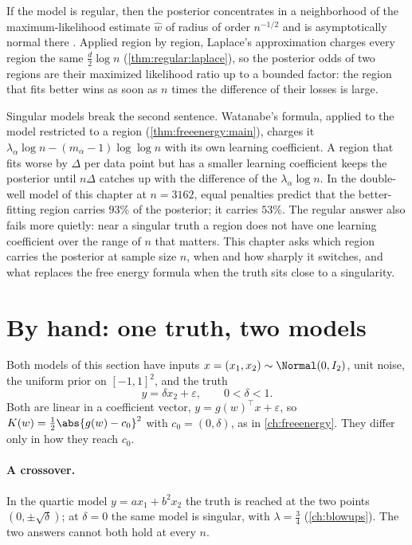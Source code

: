 \begin{refsection}
\begin{regularanswer}
If the model is regular, then the posterior concentrates in a neighborhood of the maximum-likelihood estimate $\hat w$ of radius of order $n^{-1/2}$ and is asymptotically normal there \parencite[Theorem~10.1]{vanderVaart1998}. Applied region by region, Laplace's approximation charges every region the same $\frac d2\log n$ (\cref{thm:regular:laplace}), so the posterior odds of two regions are their maximized likelihood ratio up to a bounded factor: the region that fits better wins as soon as $n$ times the difference of their losses is large.
\end{regularanswer}

Singular models break the second sentence. Watanabe's formula, applied to the model restricted to a region (\cref{thm:freeenergy:main}), charges it $\lambda_\alpha\log n-(m_\alpha-1)\log\log n$ with its own learning coefficient. A region that fits worse by $\Delta$ per data point but has a smaller learning coefficient keeps the posterior until $n\Delta$ catches up with the difference of the $\lambda_\alpha\log n$. In the double-well model of this chapter at $n=3162$, equal penalties predict that the better-fitting region carries $93\%$ of the posterior; it carries $53\%$. The regular answer also fails more quietly: near a singular truth a region does not have one learning coefficient over the range of $n$ that matters. This chapter asks which region carries the posterior at sample size $n$, when and how sharply it switches, and what replaces the free energy formula when the truth sits close to a singularity.

\section{By hand: one truth, two models}\label{sec:phases:byhand}

Both models of this section have inputs $x=(x_1,x_2)\sim\Normal(0,I_2)$, unit noise, the uniform prior on $[-1,1]^2$, and the truth
\[
y=\delta x_2+\varepsilon,\qquad 0<\delta<1 .
\]
Both are linear in a coefficient vector, $y=g(w)^\top x+\varepsilon$, so $K(w)=\frac12\abs{g(w)-c_0}^2$ with $c_0=(0,\delta)$, as in \cref{ch:freeenergy}. They differ only in how they reach $c_0$.

\paragraph{A crossover.} In the quartic model $y=ax_1+b^2x_2$ the truth is reached at the two points $(0,\pm\sqrt\delta)$; at $\delta=0$ the same model is singular, with $\lambda=\frac34$ (\cref{ch:blowups}). The two answers cannot both hold at every $n$.


\end{refsection}
